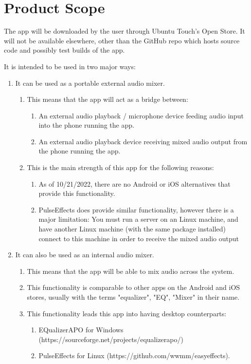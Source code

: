 \section{Product Scope}


The app will be downloaded by the user through Ubuntu Touch's Open Store. 
It will not be available elsewhere, other than the GitHub repo which hosts source code and possibly test builds of the app.

It is intended to be used in two major ways:

\begin{enumerate}
	\item It can be used as a portable external audio mixer.
	\begin{enumerate} 
		\item This means that the app will act as a bridge between:
			\begin{enumerate}
				\item An external audio playback / microphone device feeding audio input into the phone running the app.
				\item An external audio playback device receiving mixed audio output from the phone running the app.
			\end{enumerate}
		\item This is the main strength of this app for the following reasons: 
		\begin{enumerate}
				\item As of 10/21/2022, there are no Android or iOS alternatives that provide this functionality.
				\item PulseEffects does provide similar functionality, however there is a major limitation: You must run a server on an Linux machine, and have another Linux machine (with the same package installed) connect to this machine in order to receive the mixed audio output
			\end{enumerate}
	\end{enumerate}
	\item It can also be used as an internal audio mixer. 
	\begin{enumerate} 
		\item This means that the app will be able to mix audio across the system.
		\item This functionality is comparable to other apps on the Android and iOS stores, usually with the terms "equalizer", "EQ", "Mixer" in their name.
		\item This functionality leads this app into having desktop counterparts: 
		\begin{enumerate}
			\item EQualizerAPO for Windows (https://sourceforge.net/projects/equalizerapo/)
			\item PulseEffects for Linux (https://github.com/wwmm/easyeffects).
		\end{enumerate}


\end{enumerate}
\end{enumerate}
